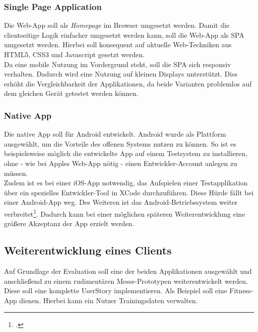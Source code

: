 \subsubsection*{Single Page Application}
\label{ssec:aufgabenstellung:spa}
Die Web-App soll als \textit{Homepage} im Browser umgesetzt werden. Damit die clientseitige Logik einfacher umgesetzt werden kann, soll die Web-App als \ac{SPA} umgesetzt werden. Hierbei soll konsequent auf aktuelle Web-Techniken aus \gls{HTML5}, \gls{CSS3} und \gls{Javascript} gesetzt werden. \\
Da eine mobile Nutzung im Vordergrund steht, soll die \ac{SPA} sich \gls{responsiv} verhalten. Dadurch wird eine Nutzung auf kleinen Displays unterstützt. Dies erhöht die Vergleichbarkeit der Applikationen, da beide Varianten problemlos auf dem gleichen Gerät getestet werden können.
\subsubsection*{Native App}
\label{ssec:aufgabenstellung:nat-app}
Die native App soll für \gls{Android} entwickelt. \gls{Android} wurde als Plattform ausgewählt, um die Vorteile des offenen Systems nutzen zu können. So ist es beispielsweise möglich die entwickelte App auf einem Testsystem zu installieren, ohne - wie bei Apples Web-App nötig - einen Entwickler-Account anlegen zu müssen.\\ 
Zudem ist es bei einer \gls{iOS}-App notwendig, das Aufspielen einer Testapplikation über ein spezielles Entwickler-Tool in \gls{XCode} durchzuführen. Diese Hürde fällt bei einer \gls{Android}-App weg. Des Weiteren ist das \gls{Android}-Betriebssystem weiter verbreitet\footcite{Statista-SmartphoneVerteilung}. Dadurch kann bei einer möglichen späteren Weiterentwicklung eine größere Akzeptanz der App erzielt werden.
\subsection{Weiterentwicklung eines Clients}
\label{ssec:umsetzung-client-entwicklung}
Auf Grundlage der Evaluation soll eine der beiden Applikationen ausgewählt und anschließend zu einem rudimentären Messe-Prototypen weiterentwickelt werden. Diese soll eine komplette \gls{UserStory} implementieren. Als Beispiel soll eine Fitness-App dienen. Hierbei kann ein Nutzer Trainingsdaten verwalten. 
